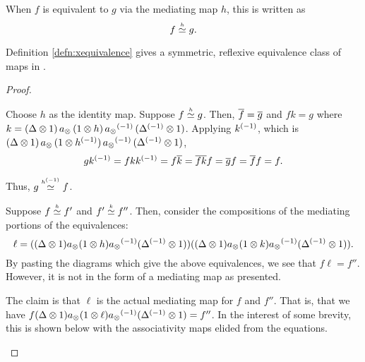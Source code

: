 \begin{notation}
  When $f$ is equivalent to $g$ via the mediating map $h$, this is written as
  \[
    f\overset{\scriptscriptstyle h}{\simeq}g.
  \]
\end{notation}


\begin{lemma}\label{lem:mediating_map_equivalence_is_symmetric_reflexive_and_transitive}
  Definition \vref{defn:xequivalence} gives a symmetric, reflexive equivalence class of maps in \X.
\end{lemma}
\begin{proof}
  \prepprooflist
  \begin{description}
     Choose $h$ as the identity map.
     Suppose $f\overset{\scriptscriptstyle h}{\simeq}g$. Then, $\overline{f} = \overline{g}$ and $f k = g$ where
      $k = (\Delta\otimes 1) \, a_{\otimes}\, (1\otimes h)\, {a_{\otimes}}^{(-1)}\,({\Delta}^{(-1)}\otimes 1)$. Applying ${k}^{(-1)}$,
      which is $(\Delta\otimes 1) \, a_{\otimes}\, (1\otimes{h}^{(-1)})\, {a_{\otimes}}^{(-1)}\,({\Delta}^{(-1)}\otimes 1)$,
      \[
        g {k}^{(-1)} = f k {k}^{(-1)} = f \overline{k} = \overline{f k} f
        = \overline{g} f = \overline{f} f = f.
      \]

      Thus, $g\overset{\scriptscriptstyle {h}^{(-1)}}{\simeq} f$.
    
     Suppose $f\overset{\scriptscriptstyle h}{\simeq} f'$ and $f' \overset{\scriptscriptstyle k}{\simeq} f''$. Then, consider the
      compositions of the mediating portions of the equivalences:
      \[
        \ell = ((\Delta \otimes 1)  a_{\otimes}  (1 \otimes h ) {a_{\otimes}}^{(-1)} ({\Delta}^{(-1)}\otimes 1))
          ( (\Delta \otimes 1) a_{\otimes}  (1 \otimes k) {a_{\otimes}}^{(-1)} ({\Delta}^{(-1)}\otimes 1)).
      \]
      By pasting the diagrams which give the above equivalences, we see that $f \ell = f''$.
      However, it is not in the form of a mediating map as presented.
      
      The claim is that $\ell$ is the actual mediating map for $f$ and $f''$. That is, that we have
      $f(\Delta \otimes 1)a_{\otimes}(1 \otimes \ell){a_{\otimes}}^{(-1)}({\Delta}^{(-1)}\otimes1) = f''$. In the interest of some
      brevity, this is shown below with the associativity maps elided from the equations.
      

\end{description}
\end{proof}

